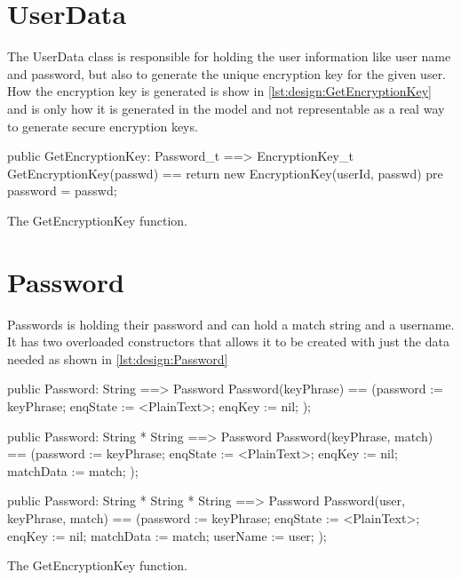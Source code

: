 \section{UserData}
The {\ttfamily UserData} class is responsible for holding the user information like user name and password, but also to generate the unique encryption key for the given user. How the encryption key is generated is show in \cref{lst:design:GetEncryptionKey} and is only how it is generated in the model and not representable as a real way to generate secure encryption keys.

\begin{listing}[H]
    \begin{vdm_al}
    public GetEncryptionKey: Password_t ==> EncryptionKey_t
        GetEncryptionKey(passwd) ==
        return new EncryptionKey(userId, passwd)
        pre password = passwd;
    \end{vdm_al}
    \caption{The {\ttfamily GetEncryptionKey} function.}
    \label{lst:design:GetEncryptionKey}
\end{listing}
\section{Password}
Passwords is holding their password and can hold a match string and a username. It has two overloaded constructors that allows it to be created with just the data needed as shown in \cref{lst:design:Password}


\begin{listing}[H]
    \begin{vdm_al}
       public Password: String ==> Password
    Password(keyPhrase) ==
        (password := keyPhrase;
         enqState := <PlainText>;
         enqKey := nil;
        );

    public Password: String * String ==> Password
    Password(keyPhrase, match) ==
        (password := keyPhrase;
         enqState := <PlainText>;
         enqKey := nil;
         matchData := match;
        );

    public Password: String * String * String ==> Password
    Password(user, keyPhrase, match) ==
        (password := keyPhrase;
         enqState := <PlainText>;
         enqKey := nil;
         matchData := match;
         userName := user;
        );
    \end{vdm_al}
    \caption{The {\ttfamily GetEncryptionKey} function.}
    \label{lst:design:Password}
\end{listing}
